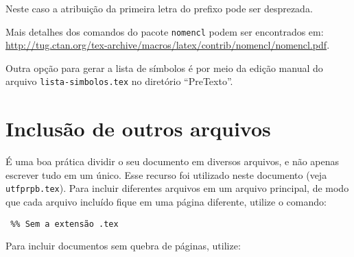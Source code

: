 \noindent Neste caso a atribuição da primeira letra do prefixo pode ser desprezada.


Mais detalhes dos comandos do pacote \texttt{nomencl} podem ser encontrados em: \url{http://tug.ctan.org/tex-archive/macros/latex/contrib/nomencl/nomencl.pdf}.

Outra opção para gerar a lista de símbolos é por meio da edição manual do arquivo \texttt{lista-simbolos.tex} no diretório ``PreTexto''.

\section{Inclusão de outros arquivos}\label{sec:inclusao}

É uma boa prática dividir o seu documento em diversos arquivos, e não apenas escrever tudo em um único. Esse recurso foi utilizado neste documento (veja \texttt{utfprpb.tex}). Para incluir diferentes arquivos em um arquivo principal, de modo que cada arquivo incluído fique em uma página diferente, utilize o comando:

\begin{SingleSpacing}%
\begin{verbatim}
 %% Sem a extensão .tex
\end{verbatim}
\end{SingleSpacing}

Para incluir documentos sem quebra de páginas, utilize:

